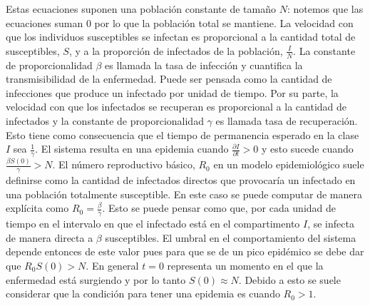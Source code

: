 Estas ecuaciones suponen una población constante de tamaño $N$: notemos que las ecuaciones suman 0 por lo que la población total se mantiene. La velocidad con que los individuos susceptibles se infectan es proporcional a la cantidad total de susceptibles, $S$, y a la proporción de infectados de la población, $\frac{I}{N}$. La constante de proporcionalidad $\beta$ es llamada la tasa de infección y cuantifica la transmisibilidad de la enfermedad. Puede ser pensada como la cantidad de infecciones que produce un infectado por unidad de tiempo. Por su parte, la velocidad con que los infectados se recuperan es proporcional a la cantidad de infectados y la constante de proporcionalidad $\gamma$ es llamada tasa de recuperación. Esto tiene como consecuencia que el tiempo de permanencia esperado en la clase $I$ sea $\frac{1}{\gamma}$. El sistema resulta en una epidemia cuando $\frac{\partial I}{\partial t} > 0$ y esto sucede cuando $\frac{\beta S(0)}{\gamma} > N$. El número reproductivo básico, $R_0$ en un modelo epidemiológico suele definirse como la cantidad de infectados directos que provocaría un infectado en una población totalmente susceptible. En este caso se puede computar de manera explícita como $R_0 = \frac{\beta}{\gamma}$. Esto se puede pensar como que, por cada unidad de tiempo en el intervalo en que el infectado está en el compartimento $I$, se infecta de manera directa a $\beta$ susceptibles. El umbral en el comportamiento del sistema depende entonces de este valor pues para que se de un pico epidémico se debe dar que $R_0 S(0) > N$.  En general $t = 0$ representa un momento en el que la enfermedad está surgiendo y por lo tanto $S(0) \approx N$. Debido a esto se suele considerar que la condición para tener una epidemia es cuando $R_0 > 1$. 

